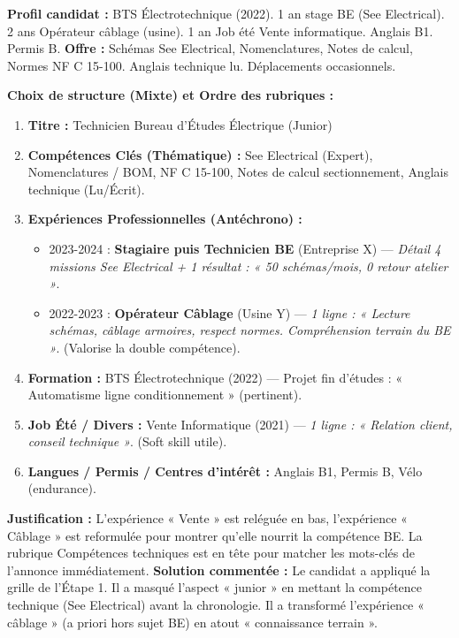 \documentclass[11pt]{article}
\newcommand{\cle}[1]{{\popxbold\color{popdark}#1}}
\begin{document}
\begin{exoresolu}
\textbf{Profil candidat :} BTS Électrotechnique (2022). 1 an stage BE (See Electrical). 2 ans Opérateur câblage (usine). 1 an Job été Vente informatique. Anglais B1. Permis B.
\textbf{Offre :} Schémas See Electrical, Nomenclatures, Notes de calcul, Normes NF C 15-100. Anglais technique lu. Déplacements occasionnels.

\textbf{Choix de structure (Mixte) et Ordre des rubriques :}
\begin{enumerate}
    \item \textbf{Titre :} Technicien Bureau d'Études Électrique (Junior)
    \item \textbf{Compétences Clés (Thématique) :} \cle{See Electrical (Expert)}, \cle{Nomenclatures / BOM}, \cle{NF C 15-100}, \cle{Notes de calcul sectionnement}, \cle{Anglais technique (Lu/Écrit)}.
    \item \textbf{Expériences Professionnelles (Antéchrono) :}
        \begin{itemize}
            \item 2023-2024 : \textbf{Stagiaire puis Technicien BE} (Entreprise X) — \emph{Détail 4 missions See Electrical + 1 résultat : « 50 schémas/mois, 0 retour atelier »}.
            \item 2022-2023 : \textbf{Opérateur Câblage} (Usine Y) — \emph{1 ligne : « Lecture schémas, câblage armoires, respect normes. Compréhension terrain du BE »}. (Valorise la double compétence).
        \end{itemize}
    \item \textbf{Formation :} BTS Électrotechnique (2022) — Projet fin d'études : « Automatisme ligne conditionnement » (pertinent).
    \item \textbf{Job Été / Divers :} Vente Informatique (2021) — \emph{1 ligne : « Relation client, conseil technique »}. (Soft skill utile).
    \item \textbf{Langues / Permis / Centres d'intérêt :} Anglais B1, Permis B, Vélo (endurance).
\end{enumerate}
\textbf{Justification :} L'expérience « Vente » est reléguée en bas, l'expérience « Câblage » est reformulée pour montrer qu'elle nourrit la compétence BE. La rubrique Compétences techniques est en tête pour matcher les mots-clés de l'annonce immédiatement.
\tcblower
\textbf{Solution commentée :} Le candidat a appliqué la grille de l'Étape 1. Il a masqué l'aspect « junior » en mettant la compétence technique (See Electrical) avant la chronologie. Il a transformé l'expérience « câblage » (a priori hors sujet BE) en atout « connaissance terrain ».
\end{exoresolu}
\end{document}
